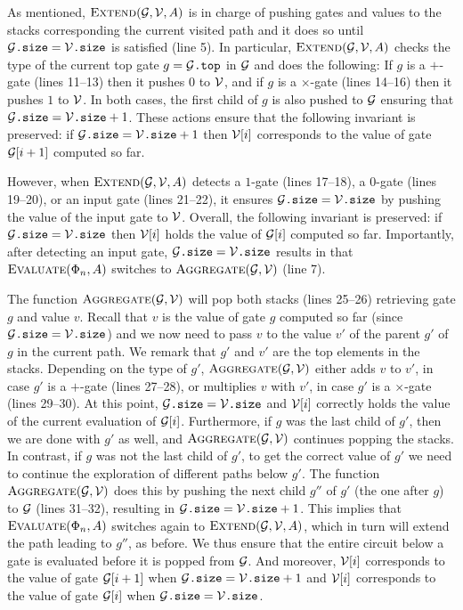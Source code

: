 As mentioned,  $\textsc{Extend}(\mathcal{G},\mathcal{V},A)$ is in charge of pushing gates and values to the stacks corresponding the current visited path and it does so until $\mathcal{G}\texttt{.size} = \mathcal{V}\texttt{.size}$ is satisfied (line 5). In particular,
$\textsc{Extend}(\mathcal{G},\mathcal{V},A)$ checks the type of the current top gate $g=\mathcal{G}\texttt{.top}$ in $\mathcal{G}$ and does the following:
If $g$ is a $+$-gate (lines 11--13) then it pushes $0$ to $\mathcal{V}$, and if $g$ is a $\times$-gate (lines 14--16) then it pushes $1$ to $\mathcal{V}$.
In both cases, the first child of $g$ is also pushed to $\mathcal{G}$ ensuring that $\mathcal{G}\texttt{.size} = \mathcal{V}\texttt{.size}+1$. These actions ensure that
the following invariant is preserved: if $\mathcal{G}\texttt{.size} = \mathcal{V}\texttt{.size}+1$ then
$\mathcal{V}[i]$ corresponds to the value of gate $\mathcal{G}[i+1]$ computed so far.

However, when $\textsc{Extend}(\mathcal{G},\mathcal{V},A)$ detects a $1$-gate (lines 17--18), a $0$-gate (lines 19--20), or an input gate (lines 21--22), it ensures  $\mathcal{G}\texttt{.size} = \mathcal{V}\texttt{.size}$
by pushing the value of the input gate to $\mathcal{V}$. Overall, the following invariant is preserved: if  $\mathcal{G}\texttt{.size} = \mathcal{V}\texttt{.size}$ then  $\mathcal{V}[i]$ holds the value of $\mathcal{G}[i]$ computed so far. Importantly, after detecting an input gate, $\mathcal{G}\texttt{.size} = \mathcal{V}\texttt{.size}$ results in that $\textsc{Evaluate}(\Phi_n,A)$ switches to $\textsc{Aggregate}(\mathcal{G},\mathcal{V})$ (line 7). 

The function $\textsc{Aggregate}(\mathcal{G},\mathcal{V})$ 
will pop both stacks (lines 25--26) retrieving gate $g$ and value $v$. Recall that $v$ is the value of gate $g$ computed so far (since  $\mathcal{G}\texttt{.size} = \mathcal{V}\texttt{.size}$) and we now need to pass $v$ to the value $v'$ of the parent  $g'$ of $g$ in the current path. We remark that $g'$ and $v'$  are  the top elements in the stacks.
Depending on the type of $g'$, $\textsc{Aggregate}(\mathcal{G},\mathcal{V})$ either adds $v$ to $v'$, in case $g'$ is a $+$-gate (lines 27--28), or multiplies $v$ with $v'$, in case $g'$ is a $\times$-gate (lines 29--30). At this point,
$\mathcal{G}\texttt{.size} = \mathcal{V}\texttt{.size}$ and $\mathcal{V}[i]$ correctly holds the value of the current evaluation of $\mathcal{G}[i]$. Furthermore, if $g$ was the last child
of $g'$, then we are done with $g'$ as well, and $\textsc{Aggregate}(\mathcal{G},\mathcal{V})$ continues popping the stacks. 
In contrast,
if $g$ was not the last child of $g'$, to get the correct value of $g'$ we need to continue the exploration of different paths 
below $g'$. The function $\textsc{Aggregate}(\mathcal{G},\mathcal{V})$ does this by pushing the next child $g''$ of $g'$ (the one after $g$) to $\mathcal{G}$ (lines 31--32), resulting in $\mathcal{G}\texttt{.size} = \mathcal{V}\texttt{.size}+1$. This implies that $\textsc{Evaluate}(\Phi_n,A)$ switches again to $\textsc{Extend}(\mathcal{G},\mathcal{V},A)$, which in turn will extend the path leading to $g''$, as before. We thus ensure
that the entire circuit below a gate is evaluated before it is popped from $\mathcal{G}$. And moreover, $\mathcal{V}[i]$ corresponds to the value of gate $\mathcal{G}[i+1]$ when $\mathcal{G}\texttt{.size} = \mathcal{V}\texttt{.size}+1$ and $\mathcal{V}[i]$ corresponds to the value of gate $\mathcal{G}[i]$ when
 $\mathcal{G}\texttt{.size} = \mathcal{V}\texttt{.size}$. 
 
